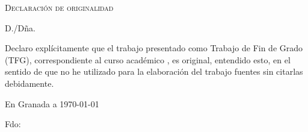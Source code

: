 %

\thispagestyle{empty}

\hfill\vfill

\textsc{Declaración de originalidad}\\\bigskip

D./Dña. \miNombre \\\medskip

Declaro explícitamente que el trabajo presentado como Trabajo de Fin de Grado (TFG), correspondiente al curso académico \miCurso, es original, entendido esto, en el sentido de que no he utilizado para la elaboración del trabajo fuentes sin citarlas debidamente.
\medskip

En Granada a \today 
\begin{flushleft} 
Fdo: \miNombre 

\end{flushleft}

\vfill

\cleardoublepage
\endinput
